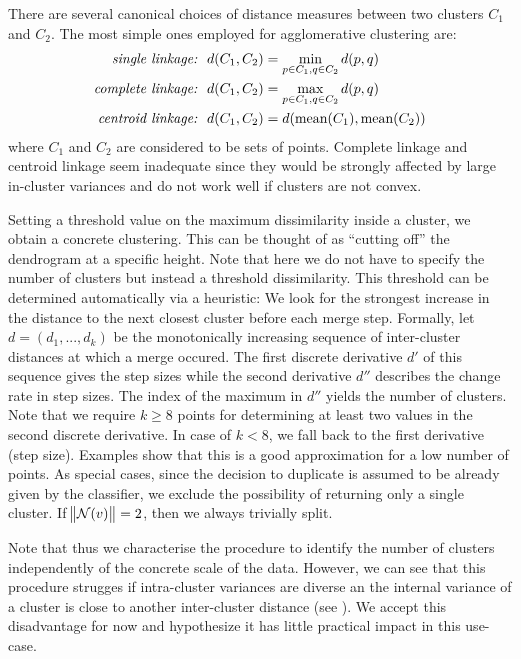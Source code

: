 \documentclass[
	fontsize=10pt, %
	twoside=false, %
	secnumdepth=1, %
  toc=indentunnumbered %
]{kaobook}
\begin{document}
There are several canonical choices of distance measures between two clusters $C_1$ and
$C_2$. The most simple ones employed for agglomerative clustering are:
\begin{align*}
  \text{{\textit{{single linkage:}}}} &~~ d(C_1, C_2) = \min_{p \in C_1, q \in C_2} d(p,q) \\
  \text{{\textit{{complete linkage:}}}} &~~ d(C_1, C_2) = \max_{p \in C_1, q \in C_2} d(p,q) \\
  \text{{\textit{{centroid linkage:}}}} &~~ d(C_1, C_2) = d(\text{mean}(C_1),\text{mean}(C_2))
\end{align*}
where $C_1$ and $C_2$ are considered to be sets of points. Complete linkage and
centroid linkage seem inadequate since they would be strongly affected by large
in-cluster variances and do not work well if clusters are not convex.

Setting a threshold value on the maximum dissimilarity inside a cluster, we
obtain a concrete clustering. This can be thought of as ``cutting off'' the
dendrogram at a specific height. Note that here we do not have to specify the
number of clusters but instead a threshold dissimilarity. This threshold can be
determined automatically via a heuristic:
We look for the strongest increase in the distance to
the next closest cluster before each merge step. Formally, let $d = (d_1, ..., d_k)$
be the monotonically increasing sequence of inter-cluster distances at which a
merge occured. The first discrete derivative $d'$ of this sequence gives the step
sizes while the second derivative $d''$ describes the change rate in step sizes. The
index of the maximum in $d''$ yields the number of clusters.
Note that we require $k \geq 8$ points for determining at least two values in the second
discrete derivative. In case of $k < 8$, we fall back to the first derivative
(step size). Examples show that this is a good approximation for a low number of points.
%
As special cases, since the decision to duplicate is assumed to be already given
by the classifier, we exclude the possibility of returning only a single
cluster. If $\norm{\mathcal{N}(v)}=2$, then we always trivially split. 

Note that thus we characterise the procedure to identify the number of clusters
independently of the concrete scale of the data. However,
we can see that this procedure strugges if
intra-cluster variances are diverse an the internal variance of a
cluster is close to another inter-cluster distance (see ).
We accept this disadvantage
for now and hypothesize it has little practical impact in this use-case.
\end{document}

